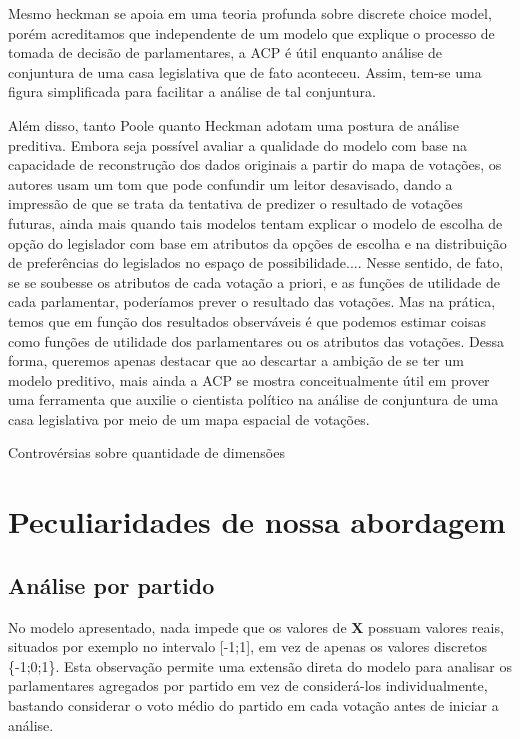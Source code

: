 \documentclass[a4paper, 12pt]{article}
\begin{document}
Mesmo heckman se apoia em uma teoria profunda sobre discrete choice model, porém acreditamos que independente de um modelo que explique o processo de tomada de decisão de parlamentares, a ACP é útil enquanto análise de conjuntura de uma casa legislativa que de fato aconteceu. Assim, tem-se uma figura simplificada para facilitar a análise de tal conjuntura. 

Além disso, tanto Poole quanto Heckman adotam uma postura de análise preditiva. Embora seja possível avaliar a qualidade do modelo com base na capacidade de reconstrução dos dados originais a partir do mapa de votações, os autores usam um tom que pode confundir um leitor desavisado, dando a impressão de que se trata da tentativa de predizer o resultado de votações futuras, ainda mais quando tais modelos tentam explicar o modelo de escolha de opção do legislador com base em atributos da opções de escolha e na distribuição de preferências do legislados no espaço de possibilidade.... Nesse sentido, de fato, se se soubesse os atributos de cada votação a priori, e as funções de utilidade de cada parlamentar, poderíamos prever o resultado das votações. Mas na prática, temos que em função dos resultados observáveis é que podemos estimar coisas como funções de utilidade dos parlamentares ou os atributos das votações. Dessa forma, queremos apenas destacar que ao descartar a ambição de se ter um modelo preditivo, mais ainda a ACP se mostra conceitualmente útil em prover uma ferramenta que auxilie o cientista político na análise de conjuntura de uma casa legislativa por meio de um mapa espacial de votações.



Controvérsias sobre quantidade de dimensões

\section{Peculiaridades de nossa abordagem}

\subsection*{Análise por partido}

No modelo apresentado, nada impede que os valores de $\mathbf{X}$ possuam valores reais, situados por exemplo no intervalo [-1;1], em vez de apenas os valores discretos \{-1;0;1\}. Esta observação permite uma extensão direta do modelo para analisar os parlamentares agregados por partido em vez de considerá-los individualmente, bastando considerar o voto médio do partido em cada votação antes de iniciar a análise.
\end{document}
